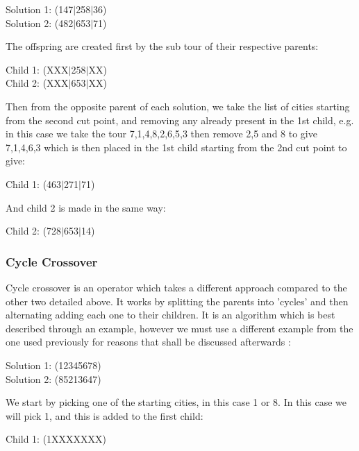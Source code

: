 \documentclass[11pt,a4paper,titlepage]{article}
\begin{document}
\begin{center}\Large
Solution 1: (147$|$258$|$36)\\
Solution 2: (482$|$653$|$71)
\end{center}

The offspring are created first by the sub tour of their respective parents:

\begin{center}\Large
Child 1: (XXX$|$258$|$XX)\\
Child 2: (XXX$|$653$|$XX)
\end{center}

Then from the opposite parent of each solution, we take the list of cities starting from the second cut point, and removing any already present in the 1st child, e.g. in this case we take the tour 7,1,4,8,2,6,5,3 then remove 2,5 and 8 to give 7,1,4,6,3 which is then placed in the 1st child starting from the 2nd cut point to give:

\begin{center}\Large
Child 1: (463$|$271$|$71)
\end{center}

And child 2 is made in the same way:

\begin{center}\Large
Child 2: (728$|$653$|$14)
\end{center}

\subsubsection{Cycle Crossover}

Cycle crossover is an operator which takes a different approach compared to the other two detailed above. It works by splitting the parents into 'cycles' and then alternating adding each one to their children. It is an algorithm which is best described through an example, however we must use a different example from the one used previously for reasons that shall be discussed afterwards \cite{GACrossover}:

\begin{center}\Large
Solution 1: (12345678)\\
Solution 2: (85213647)
\end{center}

We start by picking one of the starting cities, in this case 1 or 8. In this case we will pick 1, and this is added to the first child:

\begin{center}\Large
Child 1: (1XXXXXXX)\\
\end{center}
\end{document}
